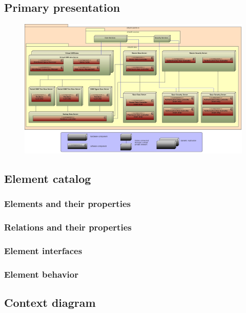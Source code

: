 \documentclass[a4paper,10pt]{paper}
\begin{document}
\subsection{Primary presentation}
\begin{center}
    \begin{figure}
      \includegraphics[width=\textwidth]{../images/deployment_data.jpg}
    \end{figure}
  \end{center}

\subsection{Element catalog}

\subsubsection{Elements and their properties}

\subsubsection{Relations and their properties}

\subsubsection{Element interfaces}

\subsubsection{Element behavior}

\subsection{Context diagram}
\end{document}
